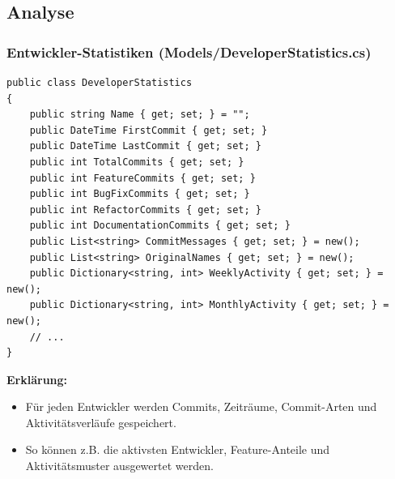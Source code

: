 \documentclass{beamer}
\begin{document}
\subsection{Analyse}
\begin{frame}[fragile]
\frametitle{Entwickler-Statistiken (Models/DeveloperStatistics.cs)}
\begin{lstlisting}[language=CSharp, basicstyle=\ttfamily\tiny, breaklines=true]
public class DeveloperStatistics
{
    public string Name { get; set; } = "";
    public DateTime FirstCommit { get; set; }
    public DateTime LastCommit { get; set; }
    public int TotalCommits { get; set; }
    public int FeatureCommits { get; set; }
    public int BugFixCommits { get; set; }
    public int RefactorCommits { get; set; }
    public int DocumentationCommits { get; set; }
    public List<string> CommitMessages { get; set; } = new();
    public List<string> OriginalNames { get; set; } = new();
    public Dictionary<string, int> WeeklyActivity { get; set; } = new();
    public Dictionary<string, int> MonthlyActivity { get; set; } = new();
    // ...
}
\end{lstlisting}

\textbf{Erklärung:}
\begin{itemize}
  \item Für jeden Entwickler werden Commits, Zeiträume, Commit-Arten und Aktivitätsverläufe gespeichert.
  \item So können z.B. die aktivsten Entwickler, Feature-Anteile und Aktivitätsmuster ausgewertet werden.
\end{itemize}
\end{frame}
\end{document}
